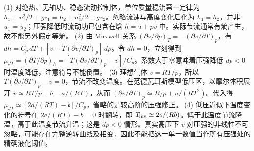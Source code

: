 (1) 对绝热、无轴功、稳态流动控制体，单位质量稳流第一定律为 \(h_1+u_1^2/2+gz_1=h_2+u_2^2/2+gz_2\)。忽略流速与高度变化后化为 \(h_1=h_2\)，并非 \(u_1=u_2\)；压强降低时流动功已包含在焓 \(h=u+pv\) 中。实际节流通常有熵产生，故不能另外假定等熵。
(2) 由 Maxwell 关系 \((\partial s/\partial p)_T=-(\partial v/\partial T)_p\)，有 \(dh=C_p\,dT+[v-T(\partial v/\partial T)_p]\,dp\)。令 \(dh=0\)，立刻得到 \(\mu_{JT}=(\partial T/\partial p)_h=[T(\partial v/\partial T)_p-v]/C_p\)。系数大于零意味着压强降低 \(dp<0\) 时温度降低，注意符号不能倒置。
(3) 理想气体 \(v=RT/p\)，所以 \(T(\partial v/\partial T)_p-v=0\)，节流不改变温度。在范德瓦耳斯模型低压区，以摩尔体积展开 \(v\simeq RT/p+b-a/(RT)\)，从而 \((\partial v/\partial T)_p\simeq R/p+a/(RT^2)\)。代入得 \(\mu_{JT}\simeq[2a/(RT)-b]/C_p\)，省略的是较高阶的压强修正。
(4) 低压近似下温度变化的符号在 \(2a/(RT)-b=0\) 时翻转，即 \(T_{\rm inv}\simeq2a/(Rb)\)。低于此温度节流降温，高于此温度节流升温；这是 \(dp<0\) 情形。真实高压下 \(v\) 对压强的非线性不可忽略，可能存在完整逆转曲线及相变，因此不能把这一单一数值当作所有压强处的精确液化阈值。

